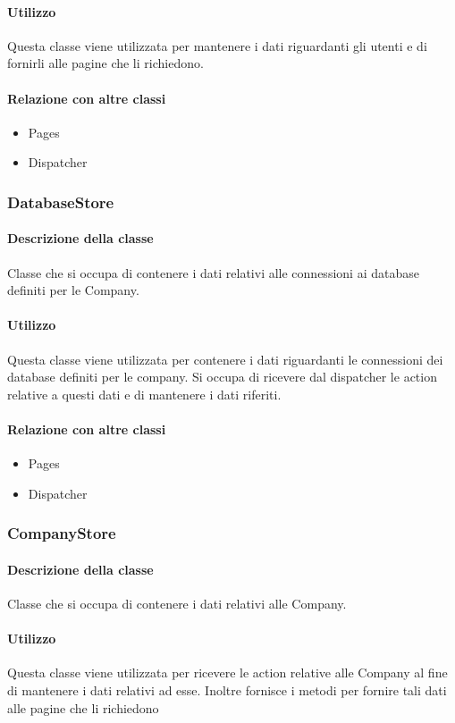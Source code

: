 \paragraph*{Utilizzo}
Questa classe viene utilizzata per mantenere i dati riguardanti gli utenti e di fornirli alle pagine che li richiedono.
\paragraph*{Relazione con altre classi}
\begin{itemize}
\item Pages
\item Dispatcher
\end{itemize}

\subsubsection{DatabaseStore}
\paragraph*{Descrizione della classe}
Classe che si occupa di contenere i dati relativi alle connessioni ai database definiti per le Company.
\paragraph*{Utilizzo}
Questa classe viene utilizzata per contenere i dati riguardanti le connessioni dei database definiti per le company. Si occupa di ricevere dal dispatcher le action relative a questi dati e di mantenere i dati riferiti.
\paragraph*{Relazione con altre classi}
\begin{itemize}
\item Pages
\item Dispatcher
\end{itemize}

\subsubsection{CompanyStore}
\paragraph*{Descrizione della classe}
Classe che si occupa di contenere i dati relativi alle Company.
\paragraph*{Utilizzo}
Questa classe viene utilizzata per ricevere le action relative alle Company al fine di mantenere i dati relativi ad esse. Inoltre fornisce i metodi per fornire tali dati alle pagine che li richiedono
